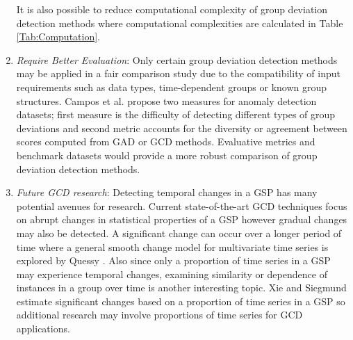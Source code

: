 \begin{enumerate}
  It is also possible to reduce computational complexity of group deviation detection methods where  computational complexities are calculated in Table \ref{Tab:Computation}.  
\item {    {\it Require Better Evaluation}:
  Only certain group deviation detection  methods may be applied in a fair comparison study due to the compatibility of input requirements such  as data types, time-dependent groups or known group structures. 
}  
Campos et al. \cite{Campos2016} propose two measures for anomaly detection datasets; %
 first measure is the difficulty of detecting different types of group deviations and second metric accounts for the diversity or agreement between scores computed from GAD or GCD methods.   Evaluative metrics and benchmark datasets would provide a more robust comparison of group deviation detection methods.   
\item {\it Future GCD research}:  
Detecting temporal changes in a GSP has many potential avenues for research. Current  state-of-the-art  GCD techniques focus on abrupt changes in statistical properties of a GSP however gradual changes may also be detected. A significant change can occur over a longer period of time where a general smooth change model for multivariate time series is explored by Quessy \cite{Quessy2011}. Also since only a proportion of time series in a GSP may experience temporal changes, examining  similarity or dependence of instances in a group over time is another interesting topic. Xie and Siegmund \cite{xie2013}  estimate significant changes based on a proportion of time series in a GSP so additional research may involve  proportions of time series for GCD applications. 


 \end{enumerate}
